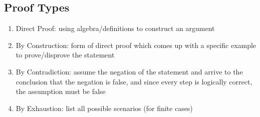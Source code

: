 \documentclass[landscape, a4paper]{article}
\let\geq\geqslant
\newcommand{\Z}{\mathbb{Z}}
\newcommand{\customsection}[1]{
    \vspace*{-16pt}
    \section*{#1}
    \vspace*{-4pt}
}
\newenvironment{wenumerate}{\begin{enumerate}[wide, labelindent=2pt]}{\end{enumerate}}
\begin{document}
\begin{multicols*}{4}
    \customsection{Proof Types}
    \begin{wenumerate}
        \item Direct Proof: using algebra/definitions to construct an argument
        \item By Construction: form of direct proof which comes up with a specific example to prove/disprove the statement
        \item By Contradiction: assume the negation of the statement and arrive to the conclusion that the negation is false, and since every step is logically correct, the assumption must be false
        \item By Exhaustion: list all possible scenarios (for finite cases)
    \end{wenumerate}


\end{multicols*}
\end{document}
